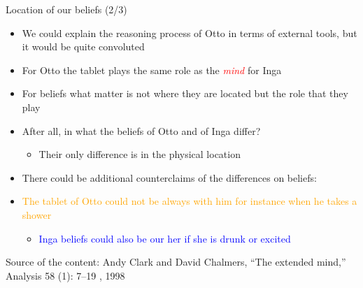 \documentclass{beamer}
\begin{document}
\begin{frame}
{\centerline{Location of our beliefs (2/3)}}
\begin{itemize}
    \item We could explain the reasoning process of Otto in terms of external tools, but it would be quite convoluted
    \item For Otto the tablet plays the same role as the \textcolor{red}{\it mind} for Inga
    \item For beliefs what matter is not where they are located but the role that they play
    \item After all, in what the beliefs of Otto and of Inga differ?
  \begin{itemize}
    \item  Their only difference is in the physical location
\end{itemize} 
\item There could be additional counterclaims of the differences on beliefs:
\item \textcolor{orange}{The tablet of Otto could not be always with him for instance when he takes a shower}
  \begin{itemize}
    \item \textcolor{blue}{Inga beliefs could also be our her if she is drunk or excited}
\end{itemize} 
\end{itemize} 

\begin{center}
    \tiny{Source of the content: Andy Clark and David Chalmers, ``The extended mind,'' Analysis 58 (1): 7--19 , 1998}
\end{center}

\end{frame}
\end{document}
